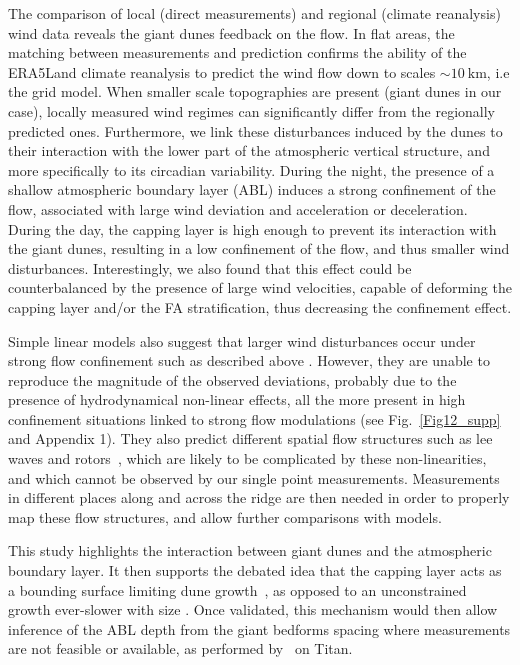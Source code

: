  The comparison of local (direct measurements) and regional (climate reanalysis) wind data reveals the giant dunes feedback on the flow. In flat areas, the matching between measurements and prediction confirms the ability of the ERA5Land climate reanalysis to predict the wind flow down to scales $\sim 10~\textrm{km}$, i.e the grid model. When smaller scale topographies are present (giant dunes in our case), locally measured wind regimes can significantly differ from the regionally predicted ones. Furthermore, we link these disturbances induced by the dunes to their interaction with the lower part of the atmospheric vertical structure, and more specifically to its circadian variability. During the night, the presence of a shallow atmospheric boundary layer (ABL) induces a strong confinement of the flow, associated with large wind deviation and acceleration or deceleration. During the day, the capping layer is high enough to prevent its interaction with the giant dunes, resulting in a low confinement of the flow, and thus smaller wind disturbances. Interestingly, we also found that this effect could be counterbalanced by the presence of large wind velocities, capable of deforming the capping layer and/or the FA stratification, thus decreasing the confinement effect.

 Simple linear models also suggest that larger wind disturbances occur under strong flow confinement such as described above \citet{andreotti2009, Andreotti2012}. However, they are unable to reproduce the magnitude of the observed deviations, probably due to the presence of hydrodynamical non-linear effects, all the more present in high confinement situations linked to strong flow modulations (see Fig.~\ref{Fig12_supp} and Appendix 1). They also predict different spatial flow structures such as lee waves and rotors~\citep{baines1995, Vosper2004}, which are likely to be complicated by these non-linearities, and which cannot be observed by our single point measurements. Measurements in different places along and across the ridge are then needed in order to properly map these flow structures, and allow further comparisons with models.

 This study highlights the interaction between giant dunes and the atmospheric boundary layer. It then supports the debated idea that the capping layer acts as a bounding surface limiting dune growth~\citep{andreotti2009}, as opposed to an unconstrained growth ever-slower with size \citep{Eastwood2011, gunn2021}. Once validated, this mechanism would then allow inference of the ABL depth from the giant bedforms spacing where measurements are not feasible or available, as performed by~\citet{Lorenz2010} on Titan.

